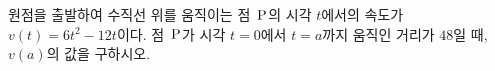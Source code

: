 원점을 출발하여 수직선 위를 움직이는 점~$\mathrm{P}$의 시각 $t$에서의 속도가 $v(t)=6t^2-12t$이다. 점~$\mathrm{P}$가 시각 $t=0$에서 $t=a$까지 움직인 거리가 $48$일 때, $v(a)$의 값을 구하시오.
